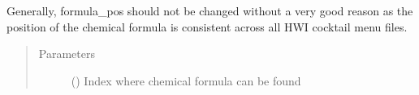 \documentclass[letterpaper,10pt,english]{sphinxmanual}
\begin{document}
\begin{fulllineitems}
\begin{fulllineitems}
Generally, formula\_pos should not be changed without a very good
reason as the position of the chemical formula is consistent across
all HWI cocktail menu files.
\begin{quote}\begin{description}
\item[{Parameters}] \leavevmode
{} () \textendash{} Index where chemical formula can be found

\end{description}\end{quote}

\end{fulllineitems}


\end{fulllineitems}

\end{document}
